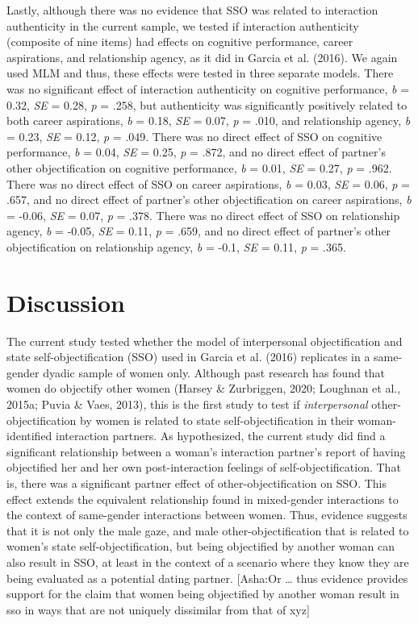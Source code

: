 \documentclass[man]{apa6}
\begin{document}
Lastly, although there was no evidence that SSO was related to
interaction authenticity in the current sample, we tested if interaction
authenticity (composite of nine items) had effects on cognitive
performance, career aspirations, and relationship agency, as it did in
Garcia et al. (2016). We again used MLM and thus, these effects were
tested in three separate models. There was no significant effect of
interaction authenticity on cognitive performance, \emph{b} = 0.32,
\emph{SE} = 0.28, \emph{p} = .258, but authenticity was significantly
positively related to both career aspirations, \emph{b} = 0.18,
\emph{SE} = 0.07, \emph{p} = .010, and relationship agency, \emph{b} =
0.23, \emph{SE} = 0.12, \emph{p} = .049. There was no direct effect of
SSO on cognitive performance, \emph{b} = 0.04, \emph{SE} = 0.25,
\emph{p} = .872, and no direct effect of partner's other objectification
on cognitive performance, \emph{b} = 0.01, \emph{SE} = 0.27, \emph{p} =
.962. There was no direct effect of SSO on career aspirations, \emph{b}
= 0.03, \emph{SE} = 0.06, \emph{p} = .657, and no direct effect of
partner's other objectification on career aspirations, \emph{b} = -0.06,
\emph{SE} = 0.07, \emph{p} = .378. There was no direct effect of SSO on
relationship agency, \emph{b} = -0.05, \emph{SE} = 0.11, \emph{p} =
.659, and no direct effect of partner's other objectification on
relationship agency, \emph{b} = -0.1, \emph{SE} = 0.11, \emph{p} = .365.

\section{Discussion}\label{discussion}

The current study tested whether the model of interpersonal
objectification and state self-objectification (SSO) used in Garcia et
al. (2016) replicates in a same-gender dyadic sample of women only.
Although past research has found that women do objectify other women
(Harsey \& Zurbriggen, 2020; Loughnan et al., 2015a; Puvia \& Vaes,
2013), this is the first study to test if \emph{interpersonal}
other-objectification by women is related to state self-objectification
in their woman-identified interaction partners. As hypothesized, the
current study did find a significant relationship between a woman's
interaction partner's report of having objectified her and her own
post-interaction feelings of self-objectification. That is, there was a
significant partner effect of other-objectification on SSO. This effect
extends the equivalent relationship found in mixed-gender interactions
to the context of same-gender interactions between women. Thus, evidence
suggests that it is not only the male gaze, and male
other-objectification that is related to women's state
self-objectification, but being objectified by another woman can also
result in SSO, at least in the context of a scenario where they know
they are being evaluated as a potential dating partner. {[}Asha:Or
\ldots{} thus evidence provides support for the claim that women being
objectified by another woman result in sso in ways that are not uniquely
dissimilar from that of xyz{]}
\end{document}
